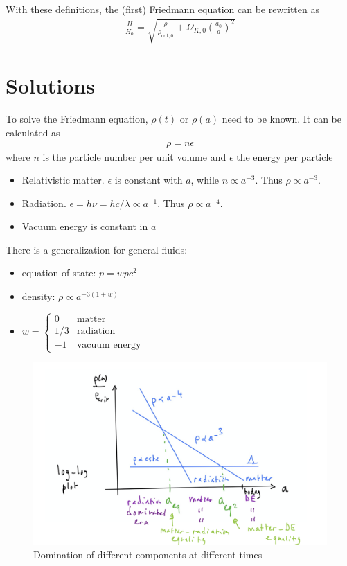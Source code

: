 With these definitions, the (first) Friedmann equation can be rewritten as
\begin{align*}
	\frac{H}{H_0} = \sqrt{\frac{\rho}{\rho_{\text{crit}, 0}} + \Omega_{K,0} \left( \frac{a_0}{a} \right)^2 }
\end{align*}




\section{Solutions}

To solve the Friedmann equation, $\rho(t)$ or $\rho(a)$ need to be known. It can be calculated as
\begin{align*}
	\rho = n \epsilon
\end{align*}
where $n$ is the particle number per unit volume and $\epsilon$ the energy per particle
\begin{itemize}
	\item Relativistic matter. $\epsilon$ is constant with $a$, while $n \propto a^{-3}$. Thus $\rho \propto a^{-3}$.
	\item Radiation. $\epsilon = h \nu = h c / \lambda \propto a^{-1}$. Thus $\rho \propto a^{-4}$.
	\item Vacuum energy is constant in $a$
\end{itemize}

There is a generalization for general fluids:
\begin{itemize}
	\item equation of state: $p = w p c^2$
	\item density: $\rho \propto a^{-3(1+w)}$
	\item $\displaystyle w = 
	\begin{cases}
	0 & \text{matter}\\
	1/3 & \text{radiation}\\
	-1 & \text{vacuum energy}
	\end{cases}
	$
\end{itemize}

\begin{figure}
	\centering
	\includegraphics[width=\textwidth]{img/ch-02/domination.png}
	\caption{Domination of different components at different times}
	\label{fig:domination}
\end{figure}

